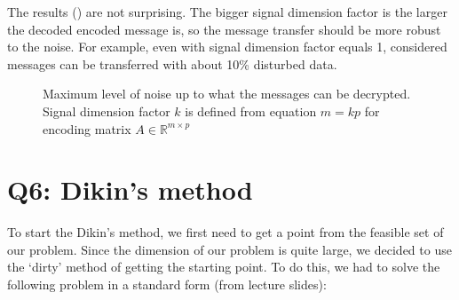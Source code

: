 \documentclass{article}
\def\R{\mathbb{R}}
\begin{document}
The results () are not surprising. The bigger signal dimension factor is the larger the decoded encoded message is, so the message transfer should be more robust to the noise. For example, even with signal dimension factor equals 1, considered messages can be transferred with about 10\% disturbed data.


\begin{figure}[hbt]
  \centering
  \pgfplotsset{compat=1.10}
  \caption[Maximum level of noise up to what the messages can be decrypted]
  {Maximum level of noise up to what the messages can be decrypted.
    Signal dimension factor $k$ is defined from equation $m=kp$ for encoding matrix $A \in \R^{m \times p}$}\label{fig:noise}
\end{figure}

\section{Q6: Dikin's method}

To start the Dikin's method, we first need to get a point from the feasible set of our problem. Since the dimension of our problem is quite large, we decided to use the `dirty' method of getting the starting point. To do this, we had to solve the following problem in a standard form (from lecture slides):
\end{document}
